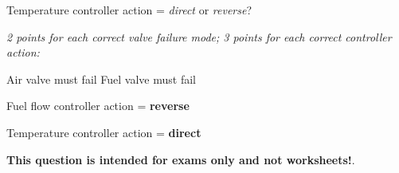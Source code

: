Temperature controller action = {\it direct} or {\it reverse}?







{\it 2 points for each correct valve failure mode; 3 points for each correct controller action:}

\vskip 10pt

Air valve must fail  \hskip 100pt Fuel valve must fail 

\vskip 10pt

Fuel flow controller action = {\bf reverse}

\vskip 10pt

Temperature controller action = {\bf direct}







{\bf This question is intended for exams only and not worksheets!}.



